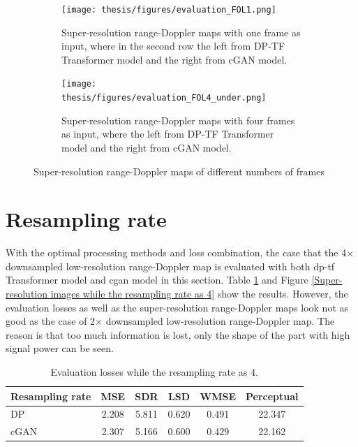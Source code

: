 \begin{figure}[!htp]
    \centering
    \begin{subfigure}{0.95\textwidth}
        \centering
        \texttt{[image: thesis/figures/evaluation\_FOL1.png]}
        \caption{Super-resolution range-Doppler maps with one frame as input, where in the second row the left from DP-TF Transformer model and the right from cGAN model.}
        \label{Super-resolution image while FOL value as 1}
    \end{subfigure}
    \vspace{0.3cm}
    \begin{subfigure}{0.95\textwidth}
        \centering
        \texttt{[image: thesis/figures/evaluation\_FOL4\_under.png]}
        \caption{Super-resolution range-Doppler maps with four frames as input, where the left from DP-TF Transformer model and the right from cGAN model.}
        \label{Super-resolution image while FOL value as 4}
    \end{subfigure}
    \caption{Super-resolution range-Doppler maps of different numbers of frames}
    \label{Super-resolution images of different FOL values}
\end{figure}

\section{Resampling rate} \label{Resampling rate comparison}
With the optimal processing methods and loss combination, the case that the 4$\times$ downsampled low-resolution range-Doppler map is evaluated with both \gls{dp}-\gls{tf} Transformer model and \gls{cgan} model in this section. Table \ref{Evaluation losses while the resampling rate as 4} and Figure \ref{Super-resolution images while the resampling rate as 4} show the results. However, the evaluation losses as well as the super-resolution range-Doppler maps look not as good as the case of 2$\times$ downsampled low-resolution range-Doppler map. The reason is that too much information is lost, only the shape of the part with high signal power can be seen.

\begin{table}[!htp]
    \centering
    \caption{Evaluation losses while the resampling rate as 4.}
    \label{Evaluation losses while the resampling rate as 4}
    \begin{tabular}{l|c|c|c|c|c}
        \hline
        Resampling rate & MSE & SDR & LSD & WMSE & Perceptual \\
        \hline
        DP & 2.208 & 5.811 & 0.620 & 0.491 & 22.347 \\
        \hline
        cGAN & 2.307 & 5.166 & 0.600 & 0.429 & 22.162 \\
        \hline
    \end{tabular}
\end{table}

